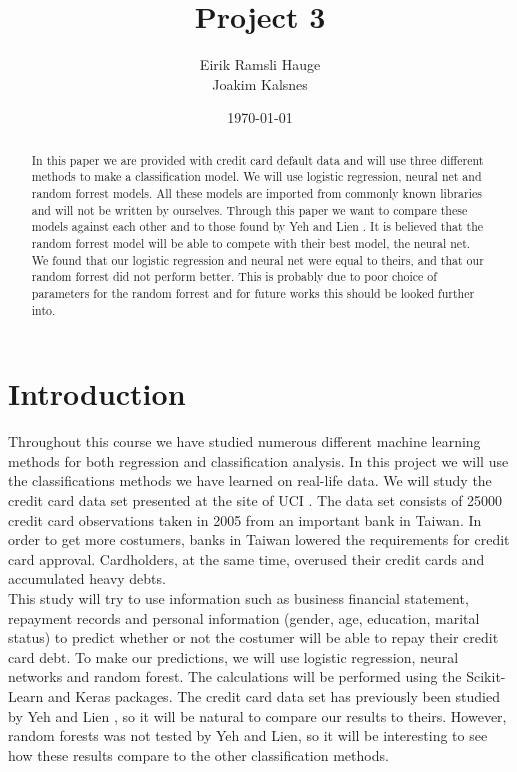\documentclass[12pt]{article}
\title{Project 3}
\author{Eirik Ramsli Hauge\\
Joakim Kalsnes
}
\date{\today}
\numberwithin{figure}{section}
\begin{document}
\maketitle
\begin{abstract}
In this paper we are provided with credit card default data and will use three different methods to make a classification model. We will use logistic regression, neural net and random forrest models. All these models are imported from commonly known libraries and will not be written by ourselves. Through this paper we want to compare these models against each other and to those found by Yeh and Lien \cite{yeh}. It is believed that the random forrest model will be able to compete with their best model, the neural net. We found that our logistic regression and neural net were equal to theirs, and that our random forrest did not perform better. This is probably due to poor choice of parameters for the random forrest and for future works this should be looked further into.
\end{abstract}
\section{Introduction}
Throughout this course we have studied numerous different machine learning methods for both regression and classification analysis. In this project we will use the classifications methods we have learned on real-life data. We will study the credit card data set presented at the site of UCI \cite{UCI}. The data set consists of 25000 credit card observations taken in 2005 from an important bank in Taiwan. In order to get more costumers, banks in Taiwan lowered the requirements for credit card approval. Cardholders, at the same time, overused their credit cards and accumulated heavy debts.\\
This study will try to use information such as business financial statement, repayment records and personal information (gender, age, education, marital status) to predict whether or not the costumer will be able to repay their credit card debt. To make our predictions, we will use logistic regression, neural networks and random forest. The calculations will be performed using the Scikit-Learn and Keras packages. The credit card data set has previously been studied by Yeh and Lien \cite{yeh}, so it will be natural to compare our results to theirs. However, random forests was not tested by Yeh and Lien, so it will be interesting to see how these results compare to the other classification methods.\\
\end{document}
